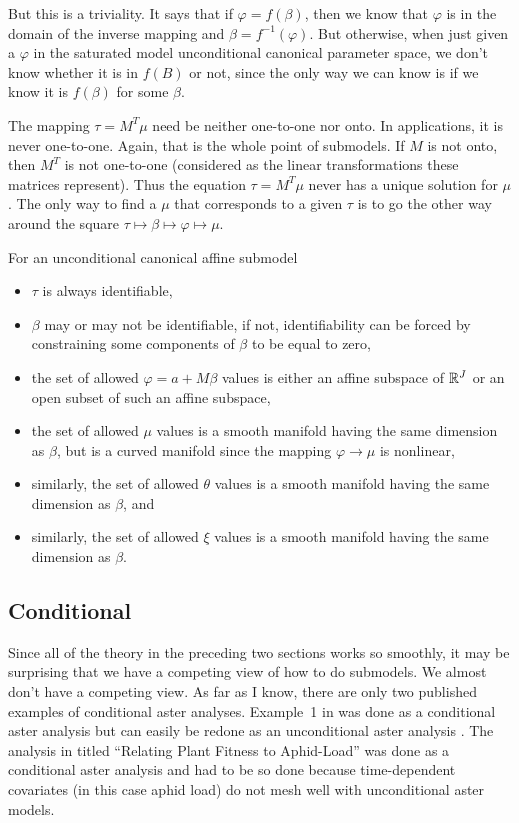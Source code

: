But this is a triviality.  It says that if $\varphi = f(\beta)$, then we
know that $\varphi$ is in the domain of the inverse mapping
and $\beta = f^{-1}(\varphi)$.  But otherwise, when just given a $\varphi$
in the saturated model unconditional canonical parameter space, we don't know
whether it is in $f(B)$ or not, since the only way we can know is if we know
it is $f(\beta)$ for some $\beta$.

The mapping $\tau = M^T \mu$ need be neither one-to-one nor onto.
In applications, it is never one-to-one.  Again, that is the whole
point of submodels.  If $M$ is not onto, then $M^T$ is not one-to-one
(considered as the linear transformations these matrices represent).
Thus the equation $\tau = M^T \mu$ never has a unique solution for $\mu$.
The only way to find a $\mu$ that corresponds to a given $\tau$ is to go
the other way around
the square $\tau \mapsto \beta \mapsto \varphi \mapsto \mu$.

For an unconditional canonical affine submodel
\begin{itemize}
\item $\tau$ is always identifiable,
\item $\beta$ may or may not be identifiable, if not, identifiability can
    be forced by constraining some components of $\beta$ to be equal to zero,
\item the set of allowed $\varphi = a + M \beta$ values is either an affine
    subspace of $\mathbb{R}^J$ or an open subset of such an affine subspace,
\item the set of allowed $\mu$ values is a smooth manifold having the same
    dimension as $\beta$, but is a curved manifold since the mapping
    $\varphi \to \mu$ is nonlinear,
\item similarly, the set of allowed $\theta$ values is a smooth manifold
    having the same dimension as $\beta$, and
\item similarly, the set of allowed $\xi$ values is a smooth manifold
    having the same dimension as $\beta$.
\end{itemize}

\subsection{Conditional}

Since all of the theory in the preceding two sections works so smoothly,
it may be surprising that we have a competing view of how to do submodels.
We almost don't have a competing view.  As far as I know, there are only
two published examples of conditional aster analyses.  Example~{1} in
\citet{aster2} was done as a conditional aster analysis but can easily
be redone as an unconditional aster analysis
\citep[Slide Deck~4, slides 47 ff.]{geyer-8931-aster}.
The analysis in \citet{aster-aphid} titled
``Relating Plant Fitness to Aphid-Load'' was done as a conditional aster
analysis and had to be so done because time-dependent covariates (in this
case aphid load) do not mesh well with unconditional aster models.

